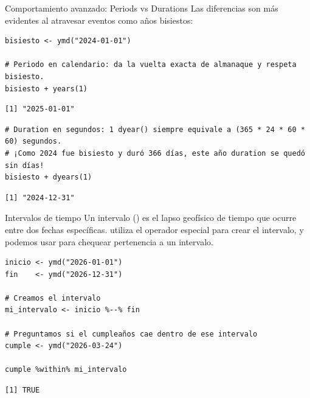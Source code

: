 \documentclass[8pt]{beamer}
\begin{document}
	\begin{frame}[fragile]{Comportamiento avanzado: Periods vs Durations}
		Las diferencias son más evidentes al atravesar eventos como años bisiestos:
		
\begin{lstlisting}[style=RScript]
bisiesto <- ymd("2024-01-01")

# Periodo en calendario: da la vuelta exacta de almanaque y respeta bisiesto.
bisiesto + years(1)
\end{lstlisting}
\begin{lstlisting}[style=RConsole]
[1] "2025-01-01"
\end{lstlisting}

\begin{lstlisting}[style=RScript]
# Duration en segundos: 1 dyear() siempre equivale a (365 * 24 * 60 * 60) segundos.
# ¡Como 2024 fue bisiesto y duró 366 días, este año duration se quedó sin días!
bisiesto + dyears(1) 
\end{lstlisting}
\begin{lstlisting}[style=RConsole]
[1] "2024-12-31"
\end{lstlisting}
	\end{frame}
	
	\begin{frame}[fragile]{Intervalos de tiempo}
		Un intervalo () es el lapso geofísico de tiempo que ocurre entre dos fechas específicas.
		 utiliza el operador especial \rscript{\%--\%} para crear el intervalo, y podemos usar  para chequear pertenencia a un intervalo.
		
\begin{lstlisting}[style=RScript]
inicio <- ymd("2026-01-01")
fin    <- ymd("2026-12-31")

# Creamos el intervalo
mi_intervalo <- inicio %--% fin

# Preguntamos si el cumpleaños cae dentro de ese intervalo
cumple <- ymd("2026-03-24")

cumple %within% mi_intervalo
\end{lstlisting}
\begin{lstlisting}[style=RConsole]
[1] TRUE
\end{lstlisting}
	\end{frame}
	
\end{document}
